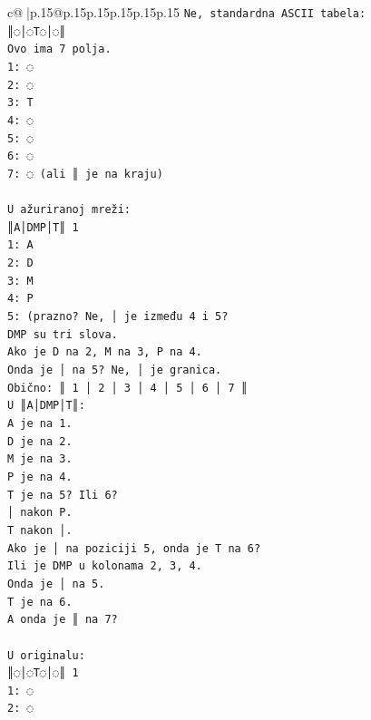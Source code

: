 \documentclass{article}
\begin{document}
{\begin{supertabular}{c@{$\;$}|p{.15\linewidth}@{}p{.15\linewidth}p{.15\linewidth}p{.15\linewidth}p{.15\linewidth}p{.15\linewidth}}
{{{\texttt{Ne, standardna ASCII tabela:} \\
\texttt{║◌│◌T◌│◌║} \\
\texttt{Ovo ima 7 polja.} \\
\texttt{1: ◌} \\
\texttt{2: ◌} \\
\texttt{3: T} \\
\texttt{4: ◌} \\
\texttt{5: ◌} \\
\texttt{6: ◌} \\
\texttt{7: ◌ (ali ║ je na kraju)} \\
\\ 
\texttt{U ažuriranoj mreži:} \\
\texttt{║A│DMP│T║ 1} \\
\texttt{1: A} \\
\texttt{2: D} \\
\texttt{3: M} \\
\texttt{4: P} \\
\texttt{5: (prazno? Ne, │ je između 4 i 5?} \\
\texttt{DMP su tri slova.} \\
\texttt{Ako je D na 2, M na 3, P na 4.} \\
\texttt{Onda je │ na 5? Ne, │ je granica.} \\
\texttt{Obično: ║ 1 │ 2 │ 3 │ 4 │ 5 │ 6 │ 7 ║} \\
\texttt{U ║A│DMP│T║:} \\
\texttt{A je na 1.} \\
\texttt{D je na 2.} \\
\texttt{M je na 3.} \\
\texttt{P je na 4.} \\
\texttt{T je na 5? Ili 6?} \\
\texttt{│ nakon P.} \\
\texttt{T nakon │.} \\
\texttt{Ako je │ na poziciji 5, onda je T na 6?} \\
\texttt{Ili je DMP u kolonama 2, 3, 4.} \\
\texttt{Onda je │ na 5.} \\
\texttt{T je na 6.} \\
\texttt{A onda je ║ na 7?} \\
\\ 
\texttt{U originalu:} \\
\texttt{║◌│◌T◌│◌║ 1} \\
\texttt{1: ◌} \\
\texttt{2: ◌} \\
}}}
\end{supertabular}}
\end{document}
